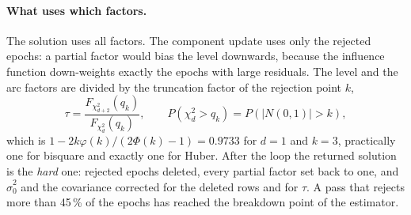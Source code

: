 \paragraph{What uses which factors.} The solution uses all factors. The component update uses only
the rejected epochs: a partial factor would bias the level downwards, because the influence
function down-weights exactly the epochs with large residuals. The level and the arc factors are
divided by the truncation factor of the rejection point $k$,
\begin{equation}
\tau=\frac{F_{\chi^2_{d+2}}(q_k)}{F_{\chi^2_d}(q_k)},\qquad P(\chi^2_d>q_k)=P(|N(0,1)|>k),
\end{equation}
which is $1-2k\varphi(k)/(2\Phi(k)-1)=0.9733$ for $d=1$ and $k=3$, practically one for bisquare and
exactly one for Huber. After the loop the returned solution is the \emph{hard} one: rejected epochs
deleted, every partial factor set back to one, and $\hat\sigma_0^2$ and the covariance corrected for
the deleted rows and for $\tau$. A pass that rejects more than 45\,\% of the epochs has reached the
breakdown point of the estimator.

